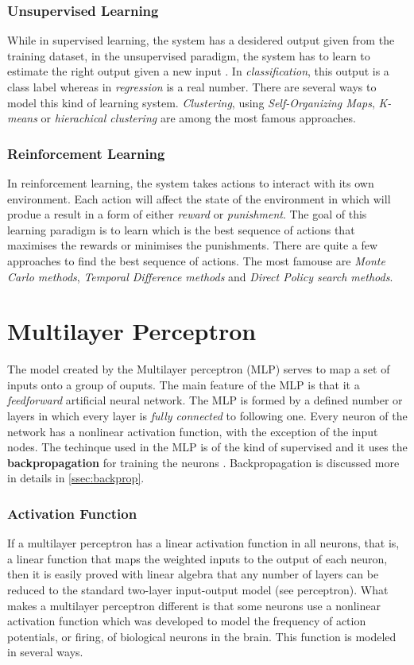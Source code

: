 \subsubsection{Unsupervised Learning}
While in supervised learning, the system has a desidered output given from the training dataset, in the unsupervised paradigm, the system has to learn to estimate the right output given a new input \cite{ghahramani2004unsupervised}. In \textit{classification}, this output is a class label whereas in \textit{regression} is a real number. There are several ways to model this kind of learning system. \textit{Clustering}, using \textit{Self-Organizing Maps}, \textit{K-means} or \textit{hierachical clustering} are among the most famous approaches.

\subsubsection{Reinforcement Learning}
In reinforcement learning, the system takes actions to interact with its own environment. Each action will affect the state of the environment in which will produe a result in a form of either \textit{reward} or \textit{punishment}. The goal of this learning paradigm is to learn which is the best sequence of actions that maximises the rewards or minimises the punishments. There are quite a few approaches to find the best sequence of actions. The most famouse are \textit{Monte Carlo methods}, \textit{Temporal Difference methods} and \textit{Direct Policy search methods}.

\section{Multilayer Perceptron}
The model created by the Multilayer perceptron (MLP) serves to map a set of inputs onto a group of ouputs. The main feature of the MLP is that it a \textit{feedforward} artificial neural network. The MLP is formed by a defined number or layers in which every layer is \textit{fully connected} to following one. Every neuron of the network has a nonlinear activation function, with the exception of the input nodes. The techinque used in the MLP is of the kind of supervised and it uses the \textbf{backpropagation} for training the neurons \cite{mlp_wiki}. Backpropagation is discussed more in details in \ref{ssec:backprop}.

\subsubsection{Activation Function}
If a multilayer perceptron has a linear activation function in all neurons, that is, a linear function that maps the weighted inputs to the output of each neuron, then it is easily proved with linear algebra that any number of layers can be reduced to the standard two-layer input-output model (see perceptron). What makes a multilayer perceptron different is that some neurons use a nonlinear activation function which was developed to model the frequency of action potentials, or firing, of biological neurons in the brain. This function is modeled in several ways.

